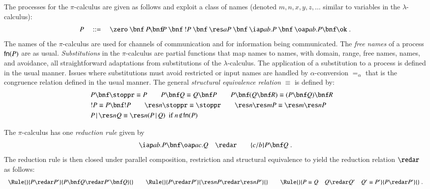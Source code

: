 \documentclass{llncs}
\begin{document}
The processes for the $\pi$-calculus are given as follows and exploit a class of names (denoted $m,n,x,y,z,\ldots$ similar to variables in the $\lambda$-calculus):
\begin{equation*}
P \quad ::=\quad  \zero \ \bnf\  P\!\bnf\!P \ \bnf\  !P \ \bnf\  \res a P \ \bnf\  \iap a b.P \ \bnf\  \oap a b.P\bnf \ok\; .
\end{equation*}
The names of the $\pi$-calculus are used for channels of communication and for information being communicated. 
The {\em free names} of a process ${\sf fn}(P)$ are as usual. 
{\em Substitutions} in the $\pi$-calculus are partial functions that map names to names,
with domain, range, free names, names, and avoidance, all straightforward adaptations from
substitutions of the $\lambda$-calculus.
The application of a substitution to a process is defined in the usual manner.
Issues where substitutions must avoid restricted or input names are handled by $\alpha$-conversion $=_\alpha$ that is the congruence relation defined in the usual manner.
The general {\em structural equivalence relation} $\equiv$ is defined by:
\begin{eqnarray*}
&P\bnf \stoppr \equiv P \qquad
P \bnf Q \equiv Q \bnf P\qquad
P \bnf (Q \bnf R) \equiv (P \bnf Q) \bnf R&\\&
!P \equiv P\bnf !P\qquad
\res n \stoppr \equiv \stoppr\qquad
\res n \res m P \equiv \res m \res n P&\\&
P\, | \, \res n Q \equiv \res n (P\, |\, Q)
\ \ \mbox{if } n \!\not\in\! {\sf fn}(P)&
\end{eqnarray*}

The $\pi$-calculus has one {\em reduction rule} given by
\begin{eqnarray*}
\iap a b.P \bnf \oap a c.Q &\quad\redar\quad& \{c/b\}P\bnf Q \; .
\end{eqnarray*}
The reduction rule is then closed under parallel composition, restriction and structural equivalence to yield the reduction relation $\redar$ as follows:
\begin{eqnarray*}
\begin{array}{c}
\Rule{}
{P \redar P'}{P\bnf Q \redar P'\bnf Q}{}\qquad
\Rule{}
{P \redar P'}{\res n P \redar \res n P'}{}\qquad
\Rule{}
{P \equiv Q \quad Q \redar Q'\quad Q' \equiv P'}{P \redar P'}{} \; .
\end{array}
\end{eqnarray*}
\end{document}
